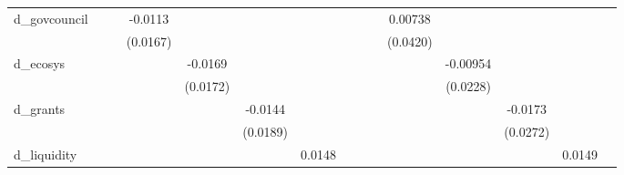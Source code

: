 {\begin{tabular}{l*{14}{c}}
d\_govcouncil        &                     &                     &     -0.0113         &                     &                     &                     &                     &                     &                     &     0.00738         &                     &                     &                     &                     \\
                    &                     &                     &    (0.0167)         &                     &                     &                     &                     &                     &                     &    (0.0420)         &                     &                     &                     &                     \\
d\_ecosys            &                     &                     &                     &     -0.0169         &                     &                     &                     &                     &                     &                     &    -0.00954         &                     &                     &                     \\
                    &                     &                     &                     &    (0.0172)         &                     &                     &                     &                     &                     &                     &    (0.0228)         &                     &                     &                     \\
d\_grants            &                     &                     &                     &                     &     -0.0144         &                     &                     &                     &                     &                     &                     &     -0.0173         &                     &                     \\
                    &                     &                     &                     &                     &    (0.0189)         &                     &                     &                     &                     &                     &                     &    (0.0272)         &                     &                     \\
d\_liquidity         &                     &                     &                     &                     &                     &      0.0148         &                     &                     &                     &                     &                     &                     &      0.0149         &                     \\

\end{tabular}}
